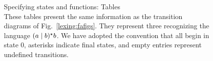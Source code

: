 \begin{figure}[btp]%
\myfloatalign%
\label{lexing:fatables}%
\caption[Specifying  states and functions: Tables]{%
Specifying  states and functions: Tables\\
These tables present the same information as the transition diagrams of Fig.~\ref{lexing:fafigs}. They represent three \FAs recognizing the language $(a \mid b)^{\star}{} b$. We have adopted the convention that 
all \FAs begin in state 0, 
asterisks indicate final states, and
empty entries represent undefined transitions.}%
\captionsetup{position=top}%
\qquad
{}\qquad%
\end{figure}
